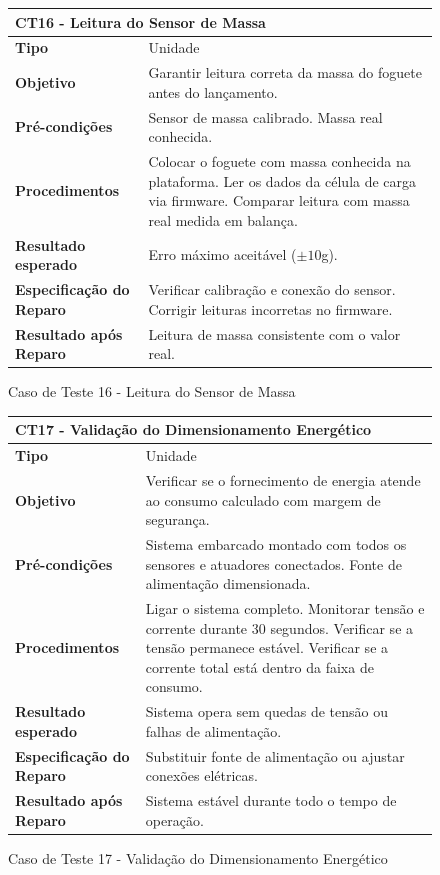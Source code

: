 \begin{figure}[H]
    \centering
\begin{longtable}{|p{}|p{}|}
\hline
\multicolumn{2}{|l|}{\textbf{CT16 - Leitura do Sensor de Massa}} \\
\hline
\textbf{Tipo} & Unidade \\
\hline
\textbf{Objetivo} & Garantir leitura correta da massa do foguete antes do lançamento. \\
\hline
\textbf{Pré-condições} &  Sensor de massa calibrado.  Massa real conhecida.  \\
\hline
\textbf{Procedimentos} &  Colocar o foguete com massa conhecida na plataforma.  Ler os dados da célula de carga via firmware.  Comparar leitura com massa real medida em balança.  \\
\hline
\textbf{Resultado esperado} & Erro máximo aceitável ($\pm 10$g). \\
\hline
\textbf{Especificação do Reparo} & Verificar calibração e conexão do sensor. Corrigir leituras incorretas no firmware. \\
\hline
\textbf{Resultado após Reparo} & Leitura de massa consistente com o valor real. \\
\hline
\end{longtable}
\caption{Caso de Teste 16 - Leitura do Sensor de Massa}
\label{fig_ct16_leitura_sensor_massa}
\end{figure}

\begin{figure}[H]
    \centering
\begin{longtable}{|p{}|p{}|}
\hline
\multicolumn{2}{|l|}{\textbf{CT17 - Validação do Dimensionamento Energético}} \\
\hline
\textbf{Tipo} & Unidade \\
\hline
\textbf{Objetivo} & Verificar se o fornecimento de energia atende ao consumo calculado com margem de segurança. \\
\hline
\textbf{Pré-condições} &  Sistema embarcado montado com todos os sensores e atuadores conectados.  Fonte de alimentação dimensionada.  \\
\hline
\textbf{Procedimentos} &  Ligar o sistema completo.  Monitorar tensão e corrente durante 30 segundos.  Verificar se a tensão permanece estável.  Verificar se a corrente total está dentro da faixa de consumo.  \\
\hline
\textbf{Resultado esperado} & Sistema opera sem quedas de tensão ou falhas de alimentação. \\
\hline
\textbf{Especificação do Reparo} & Substituir fonte de alimentação ou ajustar conexões elétricas. \\
\hline
\textbf{Resultado após Reparo} & Sistema estável durante todo o tempo de operação. \\
\hline
\end{longtable}
\caption{Caso de Teste 17 - Validação do Dimensionamento Energético}
\label{fig_ct17_validacao_dimensionamento_energetico}
\end{figure}

